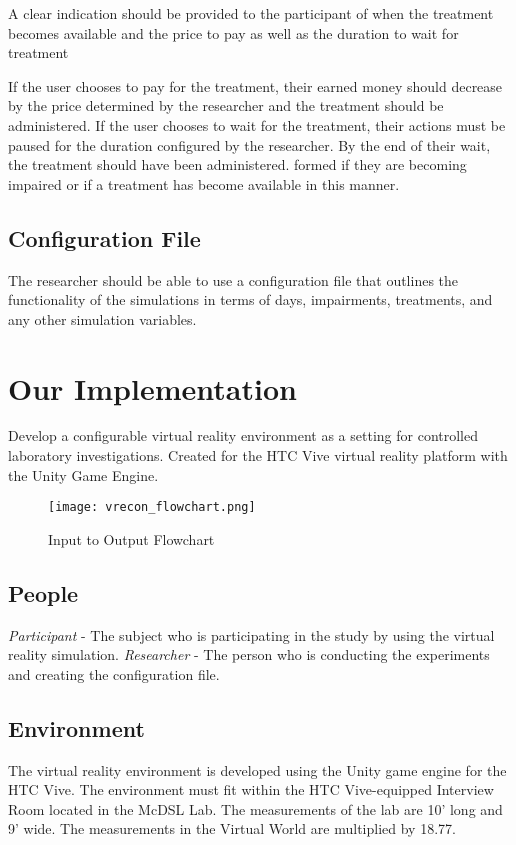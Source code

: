 \documentclass{article}
\begin{document}
A clear indication should be provided to the participant of when the treatment becomes available and the price to pay as well as the duration to wait for treatment

If the user chooses to pay for the treatment, their earned money should decrease by the price determined by the researcher and the treatment should be administered. If the user chooses to wait for the treatment, their actions must be paused for the duration configured by the researcher. By the end of their wait, the treatment should have been administered.
formed if they are becoming impaired or if a treatment has become available in this manner.

\subsection{Configuration File}
The researcher should be able to use a configuration file that outlines the functionality of the simulations in terms of days, impairments, treatments, and any other simulation variables.

\section{Our Implementation}
Develop a configurable virtual reality environment as a setting for controlled laboratory investigations. Created for the HTC Vive virtual reality platform with the Unity Game Engine.

\begin{figure}[h!]
\centering
\texttt{[image: vrecon\_flowchart.png]}
\caption{Input to Output Flowchart}
\label{fig:flowchart}
\end{figure}

\subsection{People}
\emph{Participant} - The subject who is participating in the study by using the virtual reality simulation.\newline
\emph{Researcher} - The person who is conducting the experiments and creating the configuration file.

\subsection{Environment}

The virtual reality environment is developed using the Unity game engine for the HTC Vive. The environment must fit within the HTC Vive-equipped Interview Room located in the McDSL Lab. The measurements of the lab are 10’ long and 9’ wide. The measurements in the Virtual World are multiplied by 18.77.
\end{document}
